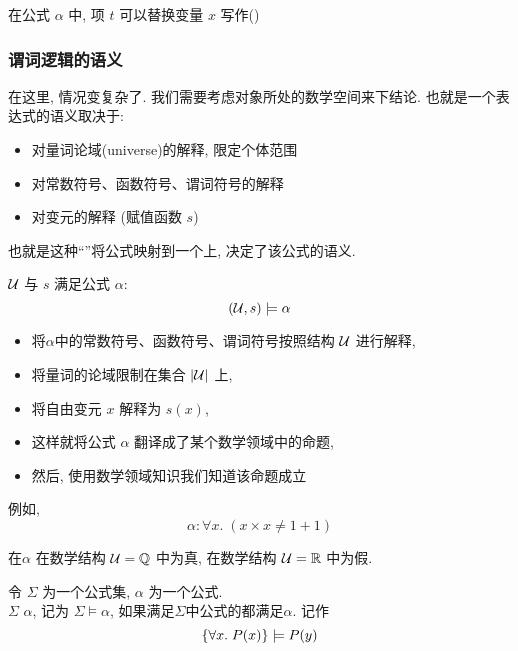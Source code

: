 在公式 $\alpha$ 中, 项 $t$ 可以替换变量 $x$ 写作(\blue{$\alpha[t/x]$})

\subsubsection{谓词逻辑的语义}

在这里, 情况变复杂了. 我们需要考虑对象所处的数学空间来下结论. 也就是一个表达式的语义取决于: 

\begin{itemize}
  \item 对量词论域(universe)的解释, 限定个体范围
  \item 对常数符号、函数符号、谓词符号的解释
  \item 对变元的解释 (赋值函数 $s$)
\end{itemize}

也就是这种``''将公式映射到一个上, 决定了该公式的语义. 

\begin{definition}
    $\mathcal{U}$ 与 $s$ 满足公式 $\alpha$:
  \[
    (\mathcal{U}, s) \models \alpha
  \]
  \begin{itemize}
    \setlength{\itemsep}{6pt}
    \item 将$\alpha$中的常数符号、函数符号、谓词符号按照结构 $\mathcal{U}$ 进行解释,
    \item 将量词的论域限制在集合 $|\mathcal{U}|$ 上,
    \item 将自由变元 $x$ 解释为 $s(x)$,
    \item 这样就将公式 $\alpha$ 翻译成了某个数学领域中的命题,
    \item 然后, 使用数学领域知识我们知道该命题成立
  \end{itemize}
\end{definition}

例如, 
\[
    \alpha: \forall x.\; (x \times x \neq 1 + 1)
  \]

在$\alpha$ 在数学结构 $\mathcal{U} = \mathbb{Q}$ 中为真, 在数学结构 $\mathcal{U} = \mathbb{R}$ 中为假. 

\begin{definition}
    令 $\Sigma$ 为一个公式集, $\alpha$ 为一个公式.  \\[8pt]
    $\Sigma$  $\alpha$, 记为 $\Sigma \models \alpha$, 
    如果满足$\Sigma$中公式的都满足$\alpha$. 
    记作
    \[
    \{\forall x.\; P(x)\} \models P(y)
  \]
\end{definition}

